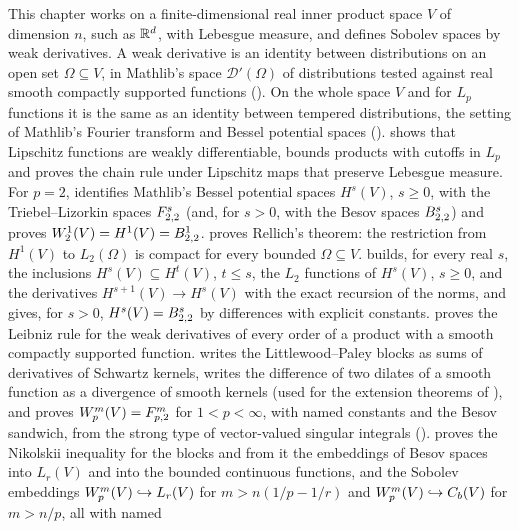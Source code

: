 This chapter works on a finite-dimensional real inner product space $V$ of dimension $n$, such
as $\mathbb{R}^d$, with Lebesgue measure, and defines Sobolev spaces by weak derivatives. A weak
derivative is an identity between distributions on an open set $\Omega \subseteq V$, in Mathlib's
space $\mathcal D'(\Omega)$ of distributions tested against real smooth compactly supported
functions (). On the whole space $V$ and for $L_p$ functions it is the
same as an identity between tempered distributions, the setting of Mathlib's Fourier transform
and Bessel potential spaces ().
 shows that Lipschitz functions are weakly
differentiable, bounds products with cutoffs in $L_p$ and proves the chain rule under Lipschitz
maps that preserve Lebesgue measure. For $p = 2$,
 identifies Mathlib's Bessel potential spaces $H^s(V)$,
$s \geq 0$, with the Triebel--Lizorkin spaces $F^{s}_{2,2}$ (and, for $s > 0$, with the Besov
spaces $B^{s}_{2,2}$) and proves $W^{1}_{2}(V) = H^1(V) = B^{1}_{2,2}$.
 proves Rellich's theorem: the restriction from $H^1(V)$ to
$L_2(\Omega)$ is compact for every bounded $\Omega \subseteq V$. 
builds, for every real $s$, the inclusions $H^s(V) \subseteq H^t(V)$, $t \leq s$, the $L_2$
functions of $H^s(V)$, $s \geq 0$, and the derivatives $H^{s+1}(V) \to H^s(V)$ with the exact
recursion of the norms, and gives, for $s > 0$, $H^s(V) = B^{s}_{2,2}$ by differences with
explicit constants. 
proves the Leibniz rule for the weak derivatives of every order of a product with a smooth
compactly supported function. 
writes the Littlewood--Paley blocks as sums of derivatives of Schwartz kernels,
 writes the difference of two dilates of a smooth function as a
divergence of smooth kernels (used for the extension theorems of ),
and  proves
$W^{m}_{p}(V) = F^{m}_{p,2}$ for $1 < p < \infty$,
with named constants and the Besov sandwich, from the strong type of vector-valued singular
integrals ().  proves the Nikolskii
inequality for the blocks and from it the embeddings of Besov spaces into $L_r(V)$ and into the
bounded continuous functions, and the Sobolev embeddings $W^{m}_{p}(V) \hookrightarrow L_r(V)$
for $m > n(1/p - 1/r)$ and $W^{m}_{p}(V) \hookrightarrow C_b(V)$ for $m > n/p$, all with named
